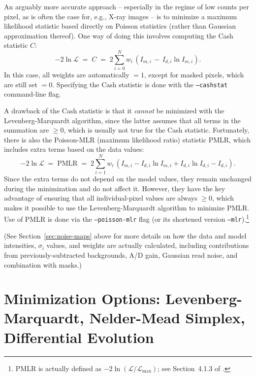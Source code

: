\documentclass[10pt,a4paper,article]{memoir}
\newcommand{\pmlr}{PMLR}
\begin{document}
An arguably more accurate approach -- especially in the regime of low counts per pixel,
as is often the case for, e.g., X-ray images -- is to minimize a maximum likelihood 
statistic based directly on Poisson statistics (rather than Gaussian approximation thereof). 
One way of doing this involves computing the Cash statistic $C$:
\begin{equation}
-2 \ln \mathcal{L}  \; = \; C \; = \; 2 \sum_{i = 0}^{N} w_{i} \, (I_{m, i} \, - \, I_{d, i} \ln I_{m, i}) .
\end{equation}
In this case, all weights are automatically $=1$, except for masked pixels, which are still set $= 0$.
Specifying the Cash statistic is done with the \texttt{--cashstat} command-line flag.

A drawback of the Cash statistic is that it \textit{cannot} be minimized with the
Levenberg-Marquardt algorithm, since the latter assumes that all terms in the summation are
$\ge 0$, which is usually not true for the Cash statistic.  Fortunately, there is also the 
Poisson-MLR (maximum likelihood ratio) statistic \pmlr, which includes extra terms based on the data values:
\begin{equation}
-2 \ln \mathcal{L}  \; = \; \mathrm{\pmlr} \; = \;  2 \sum_{i = 1}^{N} w_{i} \, 
\left( I_{m, i} - I_{d, i} \ln I_{m, i} + I_{d, i} \ln I_{d, i} - I_{d, i} \right).
\end{equation}
Since the extra terms do not depend on the
model values, they remain unchanged during the minimization and do not
affect it. However, they have the key advantage of ensuring that all
individual-pixel values are always $\ge 0$, which makes it possible to
use the Levenberg-Marquardt algorithm to minimize \pmlr. Use of \pmlr{}
is done via the \texttt{--poisson-mlr} flag (or its shortened version
\texttt{--mlr}).\footnote{\pmlr{} is actually defined as $-2 \ln
(\mathcal{L}/\mathcal{L}_{\mathrm{max}})$; see Section~4.1.3 of \cite{erwin15}.} 

(See Section~\ref{sec:noise-maps} above for more details on how the data
and model intensities, $\sigma_{i}$ values, and weights are actually
calculated, including contributions from previously-subtracted
backgrounds, A/D gain, Gaussian read noise, and combination with masks.)




\section{Minimization Options: Levenberg-Marquardt, Nelder-Mead Simplex, Differential Evolution}
\end{document}
